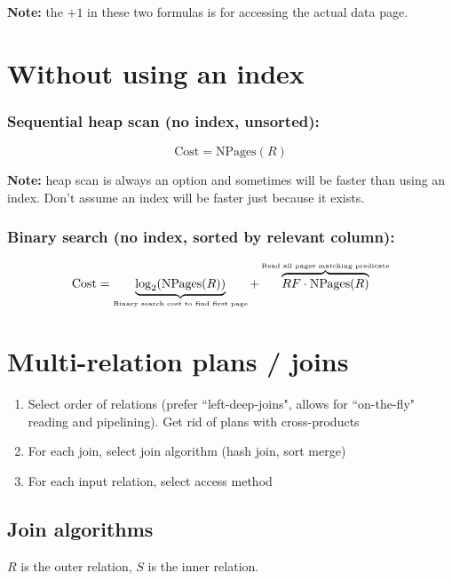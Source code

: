 \documentclass[10pt]{article}
\newcommand{\NPages}{\mathrm{NPages}}
\begin{document}
{\small\textbf{Note:} the $+1$ in these two formulas is for accessing the actual data page.}

\section{Without using an index}

\begin{mybox}
\subsubsection*{Sequential heap scan (no index, unsorted):}
$$
\text{Cost} = \NPages(R)
$$

\textbf{Note:} heap scan is always an option and sometimes will be faster than using an index. Don't assume an index will be faster just because it exists.
\end{mybox}

\subsubsection*{Binary search (no index, sorted by relevant column):}
$$
\text{Cost} = \underbrace{\log_2(\NPages(R))}_{\text{\tiny Binary search cost to find first page}} + \overbrace{RF\cdot \NPages(R)}^{\text{\tiny Read all pages matching predicate}}
$$

\newpage
\section{Multi-relation plans / joins}

\begin{enumerate}
    \item Select order of relations (prefer ``left-deep-joins", allows for ``on-the-fly" reading and pipelining). Get rid of plans with cross-products
    \item For each join, select join algorithm (hash join, sort merge)
    \item For each input relation, select access method
\end{enumerate}

\subsection{Join algorithms}

$R$ is the outer relation, $S$ is the inner relation.
\end{document}
